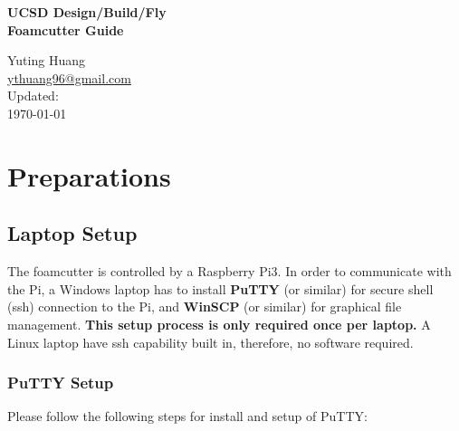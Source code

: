\documentclass[titlepage,10pt,letter]{report}
\numberwithin{equation}{chapter}
\begin{document}
\begin{titlepage}
	\centering
	\vspace*{2.5in}
	{\huge\textbf{UCSD Design/Build/Fly\\Foamcutter Guide} \par}
	
	\vspace{2.5in}
	{\large Yuting Huang \\
		\href{mailto:ythuang96@gmail.com}{ythuang96@gmail.com}} \\
	\vspace{1.5in}
	{\large
		Updated: \\
		\today }
	\vspace{1in}
\end{titlepage}

\newpage
\tableofcontents
\newpage


\chapter{Preparations}
\section{Laptop Setup}

The foamcutter is controlled by a Raspberry Pi3. In order to communicate with the Pi, a Windows laptop has to install \textbf{PuTTY} (or similar) for secure shell (ssh) connection to the Pi, and \textbf{WinSCP} (or similar) for graphical file management. \textbf{This setup process is only required once per laptop.} A Linux laptop have ssh capability built in, therefore, no software required.

\subsection{PuTTY Setup}

\noindent Please follow the following steps for install and setup of PuTTY:
\end{document}
